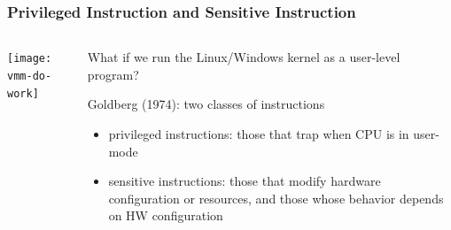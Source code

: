 \begin{frame}
	\frametitle{Privileged Instruction and Sensitive Instruction}
	
	\begin{columns}
		
		\begin{column}{.35\textwidth}
			
			\texttt{[image: vmm-do-work]}	
			
		\end{column}
		
		\begin{column}{.65\textwidth}
			What if we run the Linux/Windows kernel as a user-level program?	
			
			\begin{flushleft}
				Goldberg (1974):  two classes of instructions 
			\end{flushleft}
			\begin{itemize}
				\item privileged instructions:   those that trap when CPU is in user-mode  
				\item sensitive instructions:   those that modify hardware configuration or resources, and those whose behavior depends on HW configuration 
				
			\end{itemize} 
			
		\end{column}
		
		
	\end{columns}
	
	
\end{frame}

